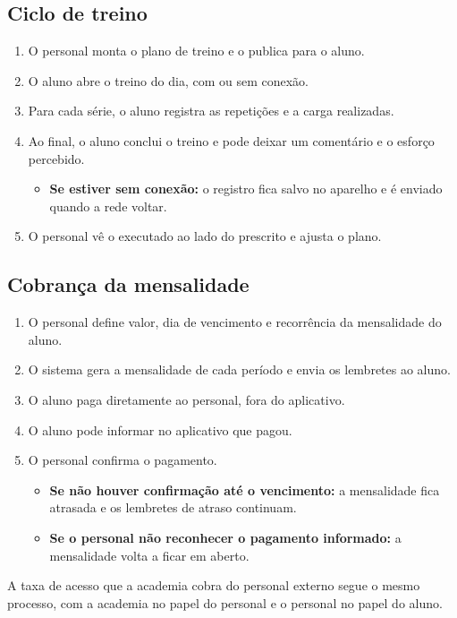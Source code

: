 \subsection{Ciclo de treino}
\begin{enumerate}
  \item O personal monta o plano de treino e o publica para o aluno.
  \item O aluno abre o treino do dia, com ou sem conexão.
  \item Para cada série, o aluno registra as repetições e a carga realizadas.
  \item Ao final, o aluno conclui o treino e pode deixar um comentário e o esforço percebido.
  \begin{itemize}
    \item \textbf{Se estiver sem conexão:} o registro fica salvo no aparelho e é enviado quando a rede voltar.
  \end{itemize}
  \item O personal vê o executado ao lado do prescrito e ajusta o plano.
\end{enumerate}

\subsection{Cobrança da mensalidade}
\begin{enumerate}
  \item O personal define valor, dia de vencimento e recorrência da mensalidade do aluno.
  \item O sistema gera a mensalidade de cada período e envia os lembretes ao aluno.
  \item O aluno paga diretamente ao personal, fora do aplicativo.
  \item O aluno pode informar no aplicativo que pagou.
  \item O personal confirma o pagamento.
  \begin{itemize}
    \item \textbf{Se não houver confirmação até o vencimento:} a mensalidade fica atrasada e os lembretes de atraso continuam.
    \item \textbf{Se o personal não reconhecer o pagamento informado:} a mensalidade volta a ficar em aberto.
  \end{itemize}
\end{enumerate}

A taxa de acesso que a academia cobra do personal externo segue o mesmo processo, com a academia no papel do personal e o personal no papel do aluno.

